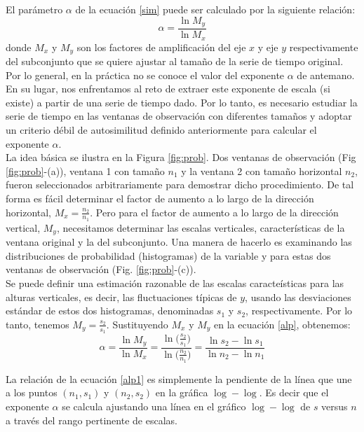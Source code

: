 \documentclass[letterpaper,titlepage,12pt,draft]{report}
\begin{document}
El par\'ametro $\alpha$ de la ecuaci\'on \ref{sim} puede ser calculado por la siguiente relaci\'on: 
\begin{equation}
\alpha= \frac{\ln{M_y}}{\ln{M_x}}
\label{alp}
\end{equation}
donde $M_x$ y $M_y$ son los factores de amplificaci\'on  del eje $x$ y eje $y$ respectivamente del subconjunto que se quiere ajustar al tama\~no de la serie de tiempo original.\\

Por lo general, en la pr\'actica no se conoce el valor del exponente $\alpha$ de antemano. En su lugar, nos enfrentamos al reto  de extraer este exponente de escala (si existe) a partir de  una serie de tiempo dado. Por lo tanto, es necesario estudiar la serie de tiempo en las ventanas de observaci\'on con diferentes tama\~nos y adoptar un criterio d\'ebil de autosimilitud definido anteriormente para calcular el exponente $\alpha$.\\

La idea b\'asica se ilustra en la Figura \ref{fig:prob}. Dos ventanas de observaci\'on (Fig \ref{fig:prob}-(a)), ventana 1 con tama\~no $n_1$ y la ventana 2 con tama\~no horizontal $n_2$, fueron seleccionados arbitrariamente para demostrar dicho procedimiento. De tal forma es f\'acil determinar el factor de aumento a lo largo de la direcci\'on horizontal, $\displaystyle M_x=\frac{n_2}{n_1}$. Pero para el factor de aumento a lo largo de la direcci\'on vertical, $M_y$, necesitamos determinar las escalas verticales, caracter\'isticas de la ventana original y la del subconjunto. Una manera de hacerlo es examinando las distribuciones de probabilidad (histogramas) de la variable y para estas dos ventanas de observaci\'on (Fig. \ref{fig:prob}-(c)).\\

Se puede definir una estimaci\'on razonable de las escalas caracte\'isticas para las alturas verticales, es decir, las fluctuaciones t\'ipicas de $y$, usando las desviaciones est\'andar de estos dos histogramas, denominadas $s_1$ y $s_2$, respectivamente. Por lo tanto, tenemos $M_y=\frac{s_2}{s_1}$. Sustituyendo $M_x$ y $M_y$ en la ecuaci\'on \ref{alp}, obtenemos:
\begin{equation}
\alpha=\frac{\ln{M_y}}{\ln{M_x}}=\frac{\ln {\displaystyle \bigg(\frac{s_2}{s_1} \bigg)}}{\ln {\displaystyle \bigg(\frac{n_2}{n_1} \bigg)}}=\frac{\ln{s_2} - \ln{s_1}}{\ln{n_2} - \ln{n_1}}
\label{alp1}
\end{equation}

La relaci\'on de la ecuaci\'on \ref{alp1} es simplemente la pendiente de la l\'inea que une a los puntos $(n_1,s_1)$ y $(n_2,s_2)$ en la gr\'afica \textit{$\log-\log$}. Es decir que  el exponente $\alpha$ se calcula ajustando una l\'inea en el gr\'afico \textit{$\log-\log$} de $s$ versus $n$ a trav\'es del rango pertinente de escalas.
\end{document}

